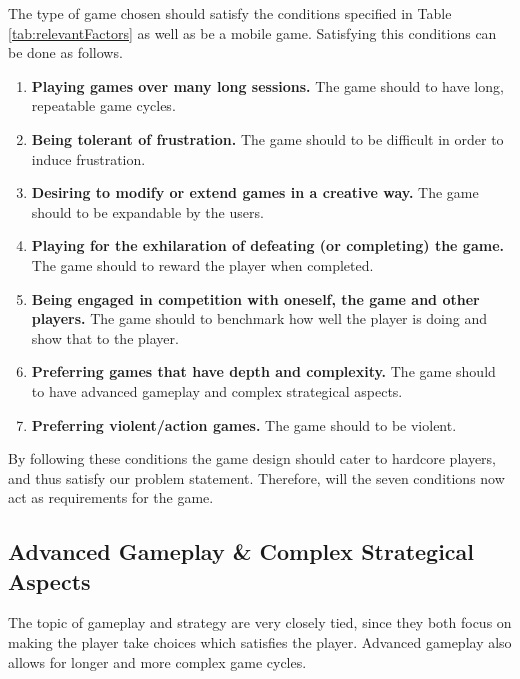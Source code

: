 The type of game chosen should satisfy the conditions specified in Table \ref{tab:relevantFactors} as well as be a mobile game.
Satisfying this conditions can be done as follows.
\begin{enumerate}\label{gamedesign:selectionofgametype:importantstuff}
\item \textbf{Playing games over many long sessions.} The game should to have long, repeatable game cycles.
\item \textbf{Being tolerant of frustration.} The game should to be difficult in order to induce frustration.
\item \textbf{Desiring to modify or extend games in a creative way.} The game should to be expandable by the users.
\item \textbf{Playing for the exhilaration of defeating (or completing) the game.} The game should to reward the player when completed.
\item \textbf{Being engaged in competition with oneself, the game and other players.} The game should to benchmark how well the player is doing and show that to the player.
\item \textbf{Preferring games that have depth and complexity.} The game should to have advanced gameplay and complex strategical aspects.
\item \textbf{Preferring violent/action games.} The game should to be violent.
\end{enumerate}
By following these conditions the game design should cater to hardcore players, and thus satisfy our problem statement. 
Therefore, will the seven conditions now act as requirements for the game.

\subsection{Advanced Gameplay \& Complex Strategical Aspects}
The topic of gameplay and strategy are very closely tied, since they both focus on making the player take choices which satisfies the player.
Advanced gameplay also allows for longer and more complex game cycles.

